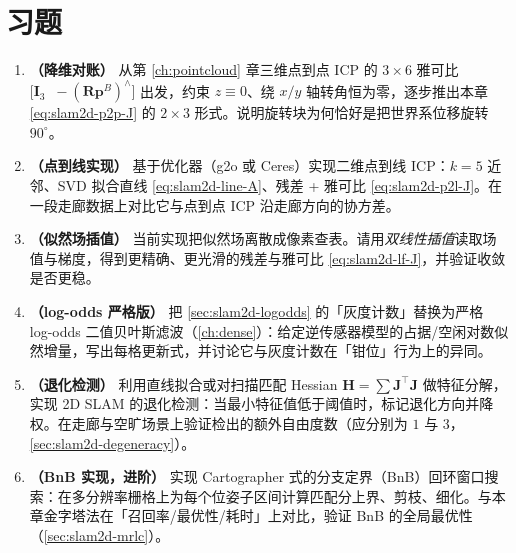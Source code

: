 \section*{习题}
\begin{enumerate}
  \item \textbf{（降维对账）} 从第 \cref{ch:pointcloud} 章三维点到点 ICP 的 $3\times 6$ 雅可比 $\big[\mathbf{I}_3\;\;-(\mathbf{R}\mathbf{p}^B)^\wedge\big]$ 出发，约束 $z\equiv 0$、绕 $x/y$ 轴转角恒为零，逐步推出本章 \cref{eq:slam2d-p2p-J} 的 $2\times 3$ 形式。说明旋转块为何恰好是把世界系位移旋转 $90^\circ$。
  \item \textbf{（点到线实现）} 基于优化器（g2o 或 Ceres）实现二维点到线 ICP：$k=5$ 近邻、SVD 拟合直线 \cref{eq:slam2d-line-A}、残差 + 雅可比 \cref{eq:slam2d-p2l-J}。在一段走廊数据上对比它与点到点 ICP 沿走廊方向的协方差。
  \item \textbf{（似然场插值）} 当前实现把似然场离散成像素查表。请用\emph{双线性插值}读取场值与梯度，得到更精确、更光滑的残差与雅可比 \cref{eq:slam2d-lf-J}，并验证收敛是否更稳。
  \item \textbf{（log-odds 严格版）} 把 \cref{sec:slam2d-logodds} 的「灰度计数」替换为严格 log-odds 二值贝叶斯滤波（\cref{ch:dense}）：给定逆传感器模型的占据/空闲对数似然增量，写出每格更新式，并讨论它与灰度计数在「钳位」行为上的异同。
  \item \textbf{（退化检测）} 利用直线拟合或对扫描匹配 Hessian $\mathbf{H}=\sum\mathbf{J}^\top\mathbf{J}$ 做特征分解，实现 2D SLAM 的退化检测：当最小特征值低于阈值时，标记退化方向并降权。在走廊与空旷场景上验证检出的额外自由度数（应分别为 $1$ 与 $3$，\cref{sec:slam2d-degeneracy}）。
  \item \textbf{（BnB 实现，进阶）} 实现 Cartographer 式的分支定界（BnB）回环窗口搜索：在多分辨率栅格上为每个位姿子区间计算匹配分上界、剪枝、细化。与本章金字塔法在「召回率/最优性/耗时」上对比，验证 BnB 的全局最优性（\cref{sec:slam2d-mrlc}）。
\end{enumerate}
